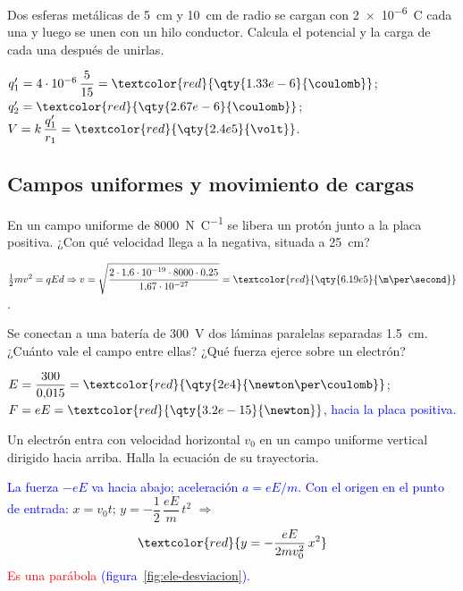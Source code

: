 \begin{exercise}
    Dos esferas metálicas de \qty{5}{\cm} y \qty{10}{\cm} de radio se cargan con \qty{2e-6}{\coulomb} cada una y luego se unen con un
    hilo conductor. Calcula el potencial y la carga de cada una después de unirlas.
    \begin{solu}
        \(q'_1 = 4\cdot 10^{-6}\,\dfrac{5}{15} = \textcolor{red}{\qty{1.33e-6}{\coulomb}}\); \(q'_2 = \textcolor{red}{\qty{2.67e-6}{\coulomb}}\);
        \(V = k\,\dfrac{q'_1}{r_1} = \textcolor{red}{\qty{2.4e5}{\volt}}\).
    \end{solu}
\end{exercise}

\subsection{Campos uniformes y movimiento de cargas}

\begin{exercise}
    En un campo uniforme de \qty{8000}{\newton\per\coulomb} se libera un protón junto a la placa positiva. ¿Con qué velocidad llega a
    la negativa, situada a \qty{25}{\cm}?
    \begin{solu}
        \(\tfrac{1}{2}m v^2 = qEd \Rightarrow v = \sqrt{\dfrac{2\cdot 1{,}6\cdot 10^{-19}\cdot 8000\cdot 0{,}25}{1{,}67\cdot 10^{-27}}} = \textcolor{red}{\qty{6.19e5}{\m\per\second}}\).
    \end{solu}
\end{exercise}

\begin{exercise}
    Se conectan a una batería de \qty{300}{\volt} dos láminas paralelas separadas \qty{1.5}{\cm}. ¿Cuánto vale el campo entre ellas?
    ¿Qué fuerza ejerce sobre un electrón?
    \begin{solu}
        \(E = \dfrac{300}{0{,}015} = \textcolor{red}{\qty{2e4}{\newton\per\coulomb}}\); \(F = eE = \textcolor{red}{\qty{3.2e-15}{\newton}}\),
        \textcolor{blue}{hacia la placa positiva.}
    \end{solu}
\end{exercise}

\begin{exercise}
    Un electrón entra con velocidad horizontal \(v_0\) en un campo uniforme vertical dirigido hacia arriba. Halla la ecuación de su trayectoria.
    \begin{solu}
        \textcolor{blue}{La fuerza \(-eE\) va hacia abajo; aceleración \(a = eE/m\). Con el origen en el punto de entrada:}
        \(x = v_0 t\); \(y = -\dfrac{1}{2}\,\dfrac{eE}{m}\,t^2\) \(\Rightarrow\)
        \[ \textcolor{red}{y = -\dfrac{eE}{2 m v_0^2}\,x^2} \]
        \textcolor{red}{Es una parábola} \textcolor{blue}{(figura~\ref{fig:ele-desviacion}).}
    \end{solu}
\end{exercise}

